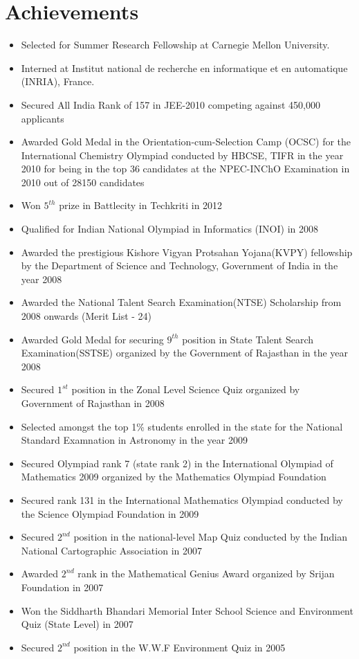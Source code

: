 \documentclass[margin,line]{resume}
\begin{document}
\begin{resume}
\begin{itemize}
  \end{itemize}

  \section{\mysidestyle Achievements}
  \begin{itemize}
  \item Selected for Summer Research Fellowship at Carnegie Mellon University.
  \item Interned at Institut national de recherche en informatique et en automatique (INRIA), France.
  \item Secured All India Rank of 157 in JEE-2010 competing against 450,000 applicants
  \item Awarded Gold Medal in the Orientation-cum-Selection Camp (OCSC) for the International Chemistry Olympiad conducted by HBCSE, TIFR in the year 2010 for being in the top 36 candidates at the NPEC-INChO Examination in 2010 out of 28150 candidates
  \item Won $5^{th}$ prize in Battlecity in Techkriti in 2012
  \item Qualified for Indian National Olympiad in Informatics (INOI) in 2008
  \item Awarded the prestigious Kishore Vigyan Protsahan Yojana(KVPY) fellowship by the Department of Science and Technology, Government of India in the year 2008
  \item Awarded the National Talent Search Examination(NTSE) Scholarship from 2008 onwards (Merit List - 24)
  \item Awarded Gold Medal for securing $9^{th}$ position in State Talent Search Examination(SSTSE) organized by the Government of Rajasthan in the year 2008
  \item Secured $1^{st}$ position in the Zonal Level Science Quiz organized by Government of Rajasthan in 2008
  \item Selected amongst the top 1\% students enrolled in the state for the National Standard Examnation in Astronomy in the year 2009
  \item Secured Olympiad rank 7 (state rank 2) in the International Olympiad of Mathematics 2009 organized by the Mathematics Olympiad Foundation
  \item Secured rank 131 in the International Mathematics Olympiad conducted by the Science Olympiad Foundation in 2009
  \item Secured $2^{nd}$ position in the national-level Map Quiz conducted by the Indian National Cartographic Association in 2007
  \item Awarded $2^{nd}$ rank in the Mathematical Genius Award organized by Srijan Foundation in 2007
  \item Won the Siddharth Bhandari Memorial Inter School Science and Environment Quiz (State Level) in 2007
  \item Secured $2^{nd}$ position in the W.W.F Environment Quiz in 2005
  \end{itemize}

\end{resume}
\end{document}
